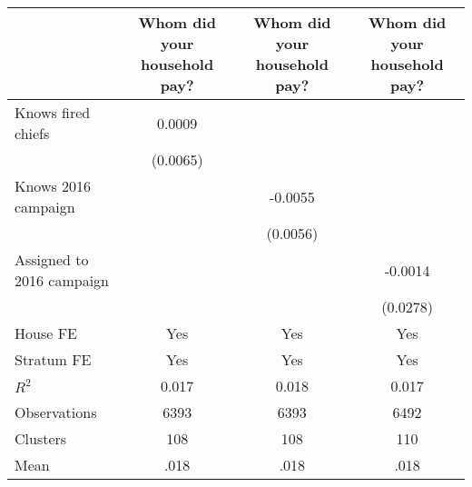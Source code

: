 {
\def\sym#1{\ifmmode^{#1}\else\(^{#1}\)\fi}
\begin{tabular}{l*{3}{c}}
\hline\hline
                &\multicolumn{1}{c}{Whom did your household pay?}&\multicolumn{1}{c}{Whom did your household pay?}&\multicolumn{1}{c}{Whom did your household pay?}\\
\hline
Knows fired chiefs&   0.0009         &                  &                  \\
                & (0.0065)         &                  &                  \\
Knows 2016 campaign&                  &  -0.0055         &                  \\
                &                  & (0.0056)         &                  \\
Assigned to 2016 campaign&                  &                  &  -0.0014         \\
                &                  &                  & (0.0278)         \\
House FE        &      Yes         &      Yes         &      Yes         \\
Stratum FE      &      Yes         &      Yes         &      Yes         \\
\hline
\(R^{2}\)       &    0.017         &    0.018         &    0.017         \\
Observations    &     6393         &     6393         &     6492         \\
Clusters        &      108         &      108         &      110         \\
Mean            &     .018         &     .018         &     .018         \\
\hline\hline
\end{tabular}
}
